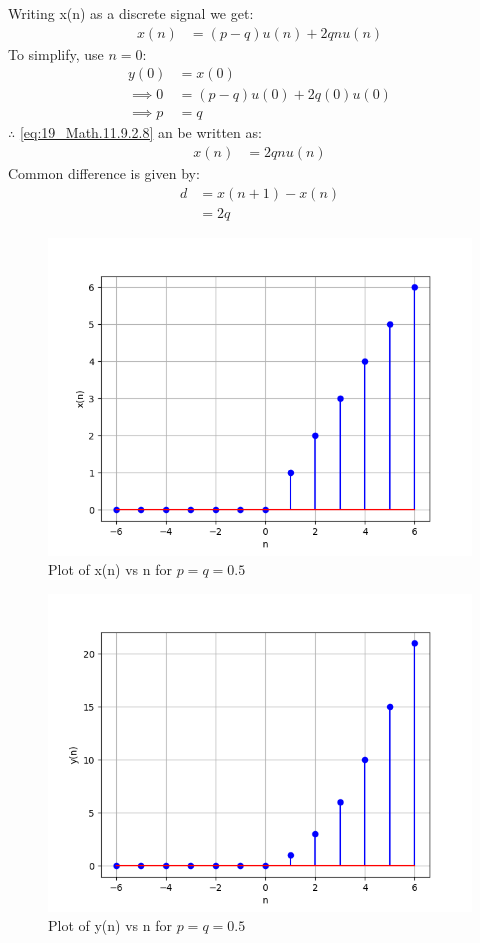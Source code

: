 \documentclass[journal,12pt,twocolumn]{IEEEtran}
\theoremstyle{remark}
\begin{document}
Writing x(n) as a discrete signal we get:
\begin{align}
    x(n) &= (p-q)u(n) + 2qnu(n)\label{eq:19_Math.11.9.2.8}
\end{align}
To simplify, use $n=0$:
\begin{align}
    y(0)&=x(0)\\
    \implies 0 &= (p-q)u(0) +2q(0)u(0)\\
    \implies p &= q
\end{align}
$\therefore$ \eqref{eq:19_Math.11.9.2.8} an be written as:
\begin{align}
    x(n) &= 2qnu(n)
\end{align}
Common difference is given by:
\begin{align}
    d &= x(n+1) - x(n)\\
    &= 2q
\end{align}
\begin{figure}[!h]
    \centering
    \includegraphics[width = \columnwidth]{ncert-maths/11/9/2/8/figs/x_plot.png}
    \caption{Plot of x(n) vs n for $p=q=0.5$}
    \label{fig:1_Math.11.9.2.8}
\end{figure}
\begin{figure}[!h]
    \centering
    \includegraphics[width = \columnwidth]{ncert-maths/11/9/2/8/figs/y_plot.png}
    \caption{Plot of y(n) vs n for $p=q=0.5$}
    \label{fig:2_Math.11.9.2.8}
\end{figure}
\end{document}
